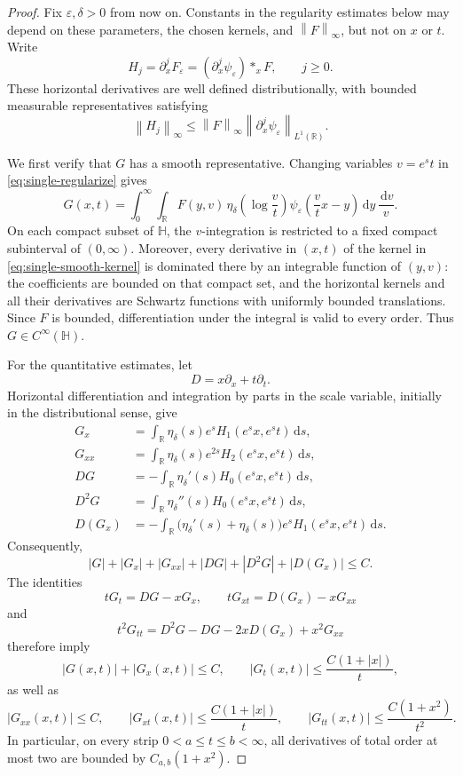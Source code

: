 \documentclass[10pt,a4paper]{amsart}
\newcommand{\dd}{\,\mathrm d}
\newcommand{\norm}[1]{\left\lVert#1\right\rVert}
\begin{document}
\begin{proof}
Fix $\varepsilon,\delta>0$ from now on. Constants in the
regularity estimates below may depend on these parameters,
the chosen kernels, and $\norm F_\infty$, but not on $x$ or $t$.
Write
\[
H_j=\partial_x^jF_\varepsilon
     =(\partial_x^j\psi_\varepsilon)*_xF,
\qquad j\ge0.
\]
These horizontal derivatives are well defined distributionally,
with bounded measurable representatives satisfying
\[
\norm{H_j}_\infty
\le \norm F_\infty
   \norm{\partial_x^j\psi_\varepsilon}_{L^1(\mathbb R)}.
\]

We first verify that $G$ has a smooth representative.
Changing variables $v=e^st$ in
\eqref{eq:single-regularize} gives
\begin{equation}\label{eq:single-smooth-kernel}
G(x,t)
=
\int_0^\infty\int_{\mathbb R}
F(y,v)\,
\eta_\delta\!\left(\log\frac vt\right)
\psi_\varepsilon\!\left(\frac vt x-y\right)
\dd y\,\frac{\dd v}{v}.
\end{equation}
On each compact subset of $\mathbb H$, the $v$-integration
is restricted to a fixed compact subinterval of $(0,\infty)$.
Moreover, every derivative in $(x,t)$ of the kernel in
\eqref{eq:single-smooth-kernel} is dominated there by an
integrable function of $(y,v)$: the coefficients are bounded
on that compact set, and the horizontal kernels and all their
derivatives are Schwartz functions with uniformly bounded
translations. Since $F$ is bounded, differentiation under the
integral is valid to every order. Thus $G\in C^\infty(\mathbb H)$.

For the quantitative estimates, let
\[
D=x\partial_x+t\partial_t.
\]
Horizontal differentiation and integration by parts in the
scale variable, initially in the distributional sense, give
\begin{align*}
G_x
&=\int_{\mathbb R}\eta_\delta(s)e^s
       H_1(e^sx,e^st)\dd s,\\
G_{xx}
&=\int_{\mathbb R}\eta_\delta(s)e^{2s}
       H_2(e^sx,e^st)\dd s,\\
DG
&=-\int_{\mathbb R}\eta_\delta'(s)
       H_0(e^sx,e^st)\dd s,\\
D^2G
&=\int_{\mathbb R}\eta_\delta''(s)
       H_0(e^sx,e^st)\dd s,\\
D(G_x)
&=-\int_{\mathbb R}
       \bigl(\eta_\delta'(s)+\eta_\delta(s)\bigr)e^s
       H_1(e^sx,e^st)\dd s.
\end{align*}
Consequently,
\[
|G|+|G_x|+|G_{xx}|+|DG|+|D^2G|+|D(G_x)|
\le C.
\]
The identities
\[
tG_t=DG-xG_x,\qquad
tG_{xt}=D(G_x)-xG_{xx}
\]
and
\[
t^2G_{tt}
=D^2G-DG-2xD(G_x)+x^2G_{xx}
\]
therefore imply
\begin{equation}\label{eq:single-derivatives}
|G(x,t)|+|G_x(x,t)|\le C,
\qquad
|G_t(x,t)|\le \frac{C(1+|x|)}{t},
\end{equation}
as well as
\begin{equation}\label{eq:single-second-derivatives}
|G_{xx}(x,t)|\le C,\qquad
|G_{xt}(x,t)|\le \frac{C(1+|x|)}{t},\qquad
|G_{tt}(x,t)|\le \frac{C(1+x^2)}{t^2}.
\end{equation}
In particular, on every strip $0<a\le t\le b<\infty$,
all derivatives of total order at most two are bounded by
$C_{a,b}(1+x^2)$.


\end{proof}
\end{document}

